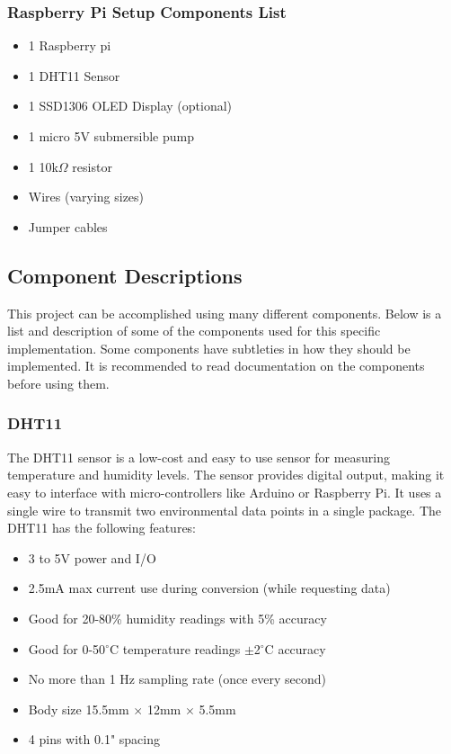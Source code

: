 \documentclass{article}
\begin{document}
\begin{multicols}{2}
		\subsubsection{Raspberry Pi Setup Components List}
		\begin{itemize}[itemsep=1pt, parsep=1pt]
			\item 1 Raspberry pi
			\item 1 DHT11 Sensor
			\item 1 SSD1306 OLED Display (optional)
			\item 1 micro 5V submersible pump
			\item 1 10k$\Omega$ resistor
			\item Wires (varying sizes)
			\item Jumper cables
		\end{itemize}
		
		
		\subsection{Component Descriptions}
		
		This project can be accomplished using many different components. Below is a list and description of some of the components used for this specific implementation. Some components have subtleties in how they should be implemented. It is recommended to read documentation on the components before using them.
		
		\subsubsection{DHT11}
		
		The DHT11 sensor is a low-cost and easy to use sensor for measuring temperature and humidity levels. The sensor provides digital output, making it easy to interface with micro-controllers like Arduino or Raspberry Pi. It uses a single wire to transmit two environmental data points in a single package. The DHT11 has the following features:			
		\begin{itemize}[itemsep=1pt, parsep=1pt]
			\item 3 to 5V power and I/O
			\item 2.5mA max current use during conversion (while requesting data)
			\item Good for 20-80\% humidity readings with 5\% accuracy
			\item Good for 0-50$^\circ$C temperature readings $\pm$2$^\circ$C accuracy
			\item No more than 1 Hz sampling rate (once every second)
			\item Body size 15.5mm $\times$ 12mm $\times$ 5.5mm
			\item 4 pins with 0.1" spacing
		\end{itemize}			
		

\end{multicols}
\end{document}
